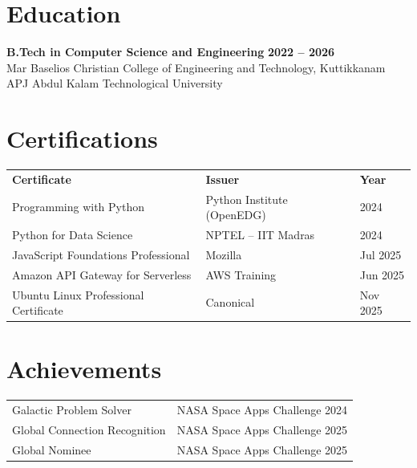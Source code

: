\documentclass[10pt, a4paper]{article}
\begin{document}
\section*{Education}

\textbf{B.Tech in Computer Science and Engineering} \hfill \textbf{2022 -- 2026}\\
Mar Baselios Christian College of Engineering and Technology, Kuttikkanam \hfill APJ Abdul Kalam Technological University

\section*{Certifications}

\renewcommand{\arraystretch}{1.1}
\begin{tabular}{@{} p{7.8cm} p{6.5cm} p{2.5cm} @{}}
\textbf{Certificate}                  & \textbf{Issuer}              & \textbf{Year} \\[1pt]
Programming with Python               & Python Institute (OpenEDG)   & 2024 \\
Python for Data Science               & NPTEL -- IIT Madras          & 2024 \\
JavaScript Foundations Professional   & Mozilla                      & Jul 2025 \\
Amazon API Gateway for Serverless     & AWS Training                 & Jun 2025 \\
Ubuntu Linux Professional Certificate & Canonical                    & Nov 2025 \\
\end{tabular}

\section*{Achievements}

\begin{tabular}{@{} p{9.5cm} p{8cm} @{}}
Galactic Problem Solver              & NASA Space Apps Challenge 2024 \\
Global Connection Recognition        & NASA Space Apps Challenge 2025 \\
Global Nominee                       & NASA Space Apps Challenge 2025 \\
\end{tabular}
\end{document}
